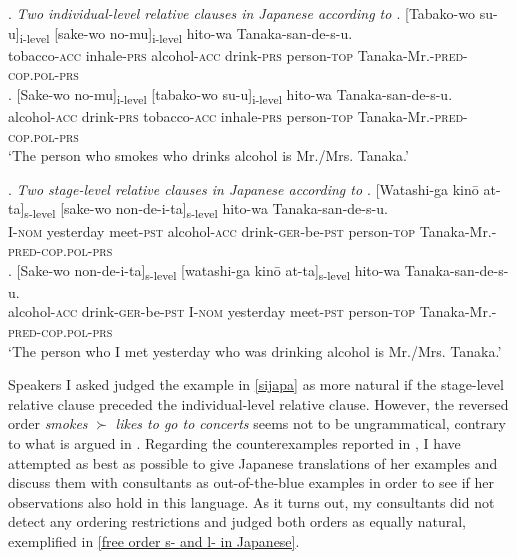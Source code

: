 \ex. \emph{Two individual-level relative clauses in Japanese according to \citet[102]{larson:2004:order}}
\ag. [Tabako-wo su-u]\textsubscript{i-level} [sake-wo no-mu]\textsubscript{i-level} hito-wa Tanaka-san-de-s-u.\\
tobacco-\textsc{acc} inhale-\textsc{prs} alcohol-\textsc{acc} drink-\textsc{prs} person-\textsc{top} Tanaka-Mr.-\textsc{pred-cop.pol-prs}\\
\bg. [Sake-wo no-mu]\textsubscript{i-level} [tabako-wo su-u]\textsubscript{i-level} hito-wa Tanaka-san-de-s-u.\\
alcohol-\textsc{acc} drink-\textsc{prs} tobacco-\textsc{acc} inhale-\textsc{prs} person-\textsc{top} Tanaka-Mr.-\textsc{pred-cop.pol-prs}\\
`The person who smokes who drinks alcohol is Mr./Mrs. Tanaka.'

\ex. \emph{Two stage-level relative clauses in Japanese according to \citet[102]{larson:2004:order}}
\ag. [Watashi-ga kinō at-ta]\textsubscript{s-level} [sake-wo non-de-i-ta]\textsubscript{s-level} hito-wa Tanaka-san-de-s-u.\\
I-\textsc{nom} yesterday meet-\textsc{pst} alcohol-\textsc{acc} drink-\textsc{ger}-be-\textsc{pst} person-\textsc{top} Tanaka-Mr.-\textsc{pred-cop.pol-prs}\\
\bg. [Sake-wo non-de-i-ta]\textsubscript{s-level} [watashi-ga kinō at-ta]\textsubscript{s-level} hito-wa Tanaka-san-de-s-u.\\
alcohol-\textsc{acc} drink-\textsc{ger}-be-\textsc{pst} I-\textsc{nom} yesterday meet-\textsc{pst} person-\textsc{top} Tanaka-Mr.-\textsc{pred-cop.pol-prs}\\
`The person who I met yesterday who was drinking alcohol is Mr./Mrs. Tanaka.'

Speakers I asked judged the example in \ref{sijapa} as more natural if the stage-level relative clause preceded the individual-level relative clause. However, the reversed order \textit{smokes} $\succ$ \textit{likes to go to concerts} seems not to be ungrammatical, contrary to what is argued in \citet{larson:2004:order}. Regarding the counterexamples reported in \citet{kim:2019:syntax}, I have attempted as best as possible to give Japanese translations of her examples and discuss them with consultants as out-of-the-blue examples in order to see if her observations also hold in this language. As it turns out, my consultants did not detect any ordering restrictions and judged both orders as equally natural, exemplified in \ref{free order s- and l- in Japanese}.

